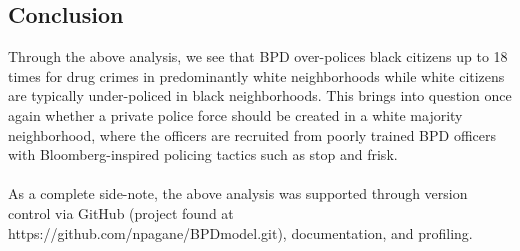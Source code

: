 \documentclass[10pt]{article}
\begin{document}
\subsection*{Conclusion}
 Through the above analysis, we see that BPD over-polices black citizens up to 18 times for drug crimes in predominantly white neighborhoods while white citizens are typically under-policed in black neighborhoods. This brings into question once again whether a private police force should be created in a white majority neighborhood, where the officers are recruited from poorly trained BPD officers with Bloomberg-inspired policing tactics such as stop and frisk. \\
 \\
 As a complete side-note, the above analysis was supported through version control via GitHub (project found at https://github.com/npagane/BPDmodel.git), documentation, and profiling.

 
\end{document}
